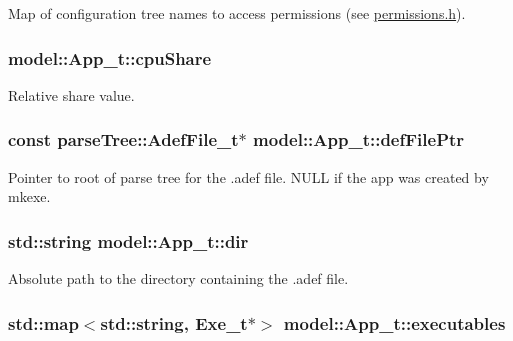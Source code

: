 Map of configuration tree names to access permissions (see \hyperlink{permissions_8h}{permissions.\+h}). 

\subsubsection[{\texorpdfstring{cpu\+Share}{cpuShare}}]{ model\+::\+App\+\_\+t\+::cpu\+Share}\hypertarget{structmodel_1_1_app__t_af94389e3a29da2287b80ecbdda222e15}{}\label{structmodel_1_1_app__t_af94389e3a29da2287b80ecbdda222e15}


Relative share value. 

\subsubsection[{\texorpdfstring{def\+File\+Ptr}{defFilePtr}}]{\setlength{\rightskip}{0pt plus 5cm}const {\bf parse\+Tree\+::\+Adef\+File\+\_\+t}$\ast$ model\+::\+App\+\_\+t\+::def\+File\+Ptr}\hypertarget{structmodel_1_1_app__t_a00d570985b816e445ac8084f2d9f3033}{}\label{structmodel_1_1_app__t_a00d570985b816e445ac8084f2d9f3033}
Pointer to root of parse tree for the .adef file. N\+U\+LL if the app was created by mkexe. 
\subsubsection[{\texorpdfstring{dir}{dir}}]{\setlength{\rightskip}{0pt plus 5cm}std\+::string model\+::\+App\+\_\+t\+::dir}\hypertarget{structmodel_1_1_app__t_a10dc084d67f48298b164ba2edfe7f34d}{}\label{structmodel_1_1_app__t_a10dc084d67f48298b164ba2edfe7f34d}


Absolute path to the directory containing the .adef file. 

\subsubsection[{\texorpdfstring{executables}{executables}}]{\setlength{\rightskip}{0pt plus 5cm}std\+::map$<$std\+::string, {\bf Exe\+\_\+t}$\ast$$>$ model\+::\+App\+\_\+t\+::executables}\hypertarget{structmodel_1_1_app__t_a40e84ff274b81c8a0f2ceb69708aed59}{}\label{structmodel_1_1_app__t_a40e84ff274b81c8a0f2ceb69708aed59}


